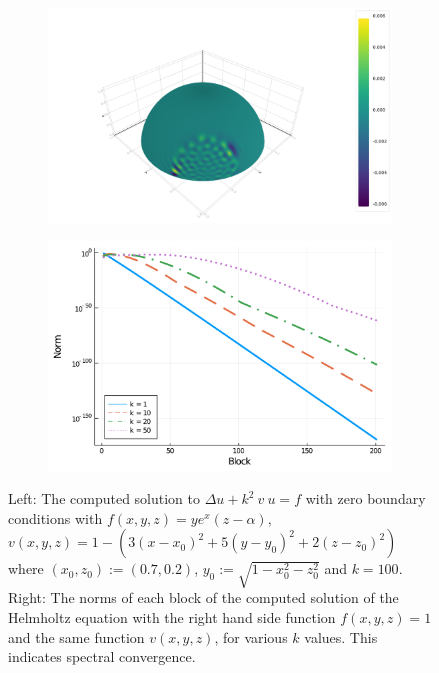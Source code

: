 \documentclass[11pt, oneside]{article}   	%
\begin{document}
\begin{figure}[t]
	\begin{subfigure}{0.5\textwidth}
	\includegraphics[scale=0.25]{helmholtz-f=wyexpx-N=60-n=300}
	\centering
	\end{subfigure}
	\begin{subfigure}{0.5\textwidth}
	\centering
	\includegraphics[scale=0.3]{solutionblocknorms-helmholtz-varyingk-N=200}
	\end{subfigure}
	\caption{Left: The computed solution to $\Delta u + k^2 \: v \: u = f$ with zero boundary conditions with $f(x,y,z) = y e^x (z - \alpha) $, $v(x,y,z) = 1 - (3(x-x_0)^2 + 5(y-y_0)^2 + 2(z-z_0)^2)$ where $(x_0, z_0) := (0.7, 0.2)$, $y_0 := \sqrt{1 - x_0^2 - z_0^2}$ and $k = 100$. Right: The norms of each block of the computed solution of the Helmholtz equation with the right hand side function $f(x,y,z) = 1$ and the same function $v(x,y,z)$, for various $k$ values. This indicates spectral convergence.}
	\centering
	\label{fig:helmholtz}
\end{figure}
\end{document}
